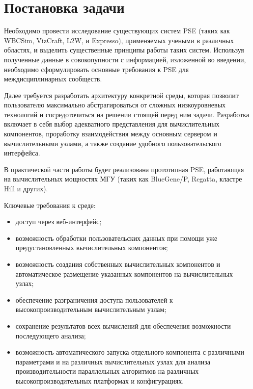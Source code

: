 \section{Постановка задачи} 
\label{definition}

Необходимо провести исследование существующих систем PSE (таких как WBCSim, VizCraft, L2W, \SW и Expresso), применяемых учеными в различных областях, и выделить существенные принципы работы таких систем. Используя полученные данные в совокопупности с информацией, изложенной во введении, необходимо сформулировать основные требования к PSE для междисциплинарных сообществ.

Далее требуется разработать архитектуру конкретной среды, которая позволит пользователю максимально абстрагироваться от сложных низкоуровневых технологий и сосредоточиться на решении стоящей перед ним задачи. Разработка включает в себя выбор адекватного представления для вычислительных компонентов, проработку взаимодействия между основным сервером и вычислительными узлами, а также создание удобного пользовательского интерфейса.

В практической части работы будет реализована прототипная PSE, работающая на вычислительных мощностях МГУ (таких как BlueGene/P, Regatta, кластре Hill и других).

Ключевые требования к среде:
\begin{itemize}
  \item доступ через веб-интерфейс;
  \item возможность обработки пользовательских данных при помощи уже предустановленных вычислительных компонентов;
  \item возможность создания собственных вычислительных компонентов и автоматическое размещение указанных компонентов на вычислительных узлах;
  \item обеспечение разграничения доступа пользователей к высокопроизводительным вычислительным узлам;
  \item сохранение результатов всех вычислений для обеспечения возможности последующего анализа;
  \item возможность автоматического запуска отдельного компонента с различными параметрами и на различных вычислительных узлах для анализа производительности параллельных алгоритмов на различных высокопроизводительных платформах и конфигурациях.
\end{itemize}


